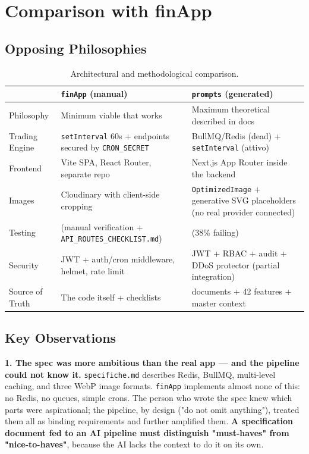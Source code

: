 \documentclass[11pt,a4paper]{article}
\newcommand{\file}[1]{\texttt{\small #1}}
\begin{document}
	\section{Comparison with finApp}
	
	\subsection{Opposing Philosophies}
	
	\begin{table}[h!]
		\centering
		\small
		\begin{tabular}{>{\raggedright\arraybackslash}p{4.2cm}>{\raggedright\arraybackslash}p{4.9cm}>{\raggedright\arraybackslash}p{4.9cm}}
			\toprule
			& \textbf{\file{finApp} (manual)} & \textbf{\file{prompts} (generated)} \\
			\midrule
			Philosophy & Minimum viable that works & Maximum theoretical described in docs \\
			Trading Engine & \file{setInterval} 60s + endpoints secured by \file{CRON\_SECRET} & BullMQ/Redis (dead) + \file{setInterval} (attivo) \\
			Frontend & Vite SPA, React Router, separate repo & Next.js App Router inside the backend \\
			Images & Cloudinary with client-side cropping & \file{OptimizedImage} + generative SVG placeholders (no real provider connected) \\
			Testing & 0 (manual verification + \file{API\_ROUTES\_CHECKLIST.md}) & 963 (38\% failing) \\
			Security & JWT + auth/cron middleware, helmet, rate limit & JWT + RBAC + audit + DDoS protector (partial integration) \\
			Source of Truth & The code itself + checklists & 5 documents + 42 features + master context \\
			\bottomrule
		\end{tabular}
		\caption{Architectural and methodological comparison.}
	\end{table}
	
	\subsection{Key Observations}
	
	\textbf{1. The spec was more ambitious than the real app --- and the pipeline could not know it.} \file{specifiche.md} describes Redis, BullMQ, multi-level caching, and three WebP image formats. \file{finApp} implements almost none of this: no Redis, no queues, simple crons. The person who wrote the spec knew which parts were aspirational; the pipeline, by design ("do not omit anything"), treated them all as binding requirements and further amplified them. \textbf{A specification document fed to an AI pipeline must distinguish "must-haves" from "nice-to-haves"}, because the AI lacks the context to do it on its own.
	
\end{document}
